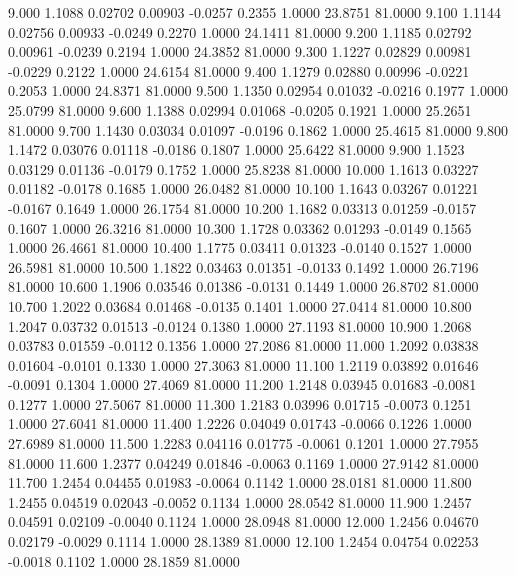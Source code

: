    9.000   1.1088   0.02702   0.00903  -0.0257   0.2355   1.0000  23.8751  81.0000
   9.100   1.1144   0.02756   0.00933  -0.0249   0.2270   1.0000  24.1411  81.0000
   9.200   1.1185   0.02792   0.00961  -0.0239   0.2194   1.0000  24.3852  81.0000
   9.300   1.1227   0.02829   0.00981  -0.0229   0.2122   1.0000  24.6154  81.0000
   9.400   1.1279   0.02880   0.00996  -0.0221   0.2053   1.0000  24.8371  81.0000
   9.500   1.1350   0.02954   0.01032  -0.0216   0.1977   1.0000  25.0799  81.0000
   9.600   1.1388   0.02994   0.01068  -0.0205   0.1921   1.0000  25.2651  81.0000
   9.700   1.1430   0.03034   0.01097  -0.0196   0.1862   1.0000  25.4615  81.0000
   9.800   1.1472   0.03076   0.01118  -0.0186   0.1807   1.0000  25.6422  81.0000
   9.900   1.1523   0.03129   0.01136  -0.0179   0.1752   1.0000  25.8238  81.0000
  10.000   1.1613   0.03227   0.01182  -0.0178   0.1685   1.0000  26.0482  81.0000
  10.100   1.1643   0.03267   0.01221  -0.0167   0.1649   1.0000  26.1754  81.0000
  10.200   1.1682   0.03313   0.01259  -0.0157   0.1607   1.0000  26.3216  81.0000
  10.300   1.1728   0.03362   0.01293  -0.0149   0.1565   1.0000  26.4661  81.0000
  10.400   1.1775   0.03411   0.01323  -0.0140   0.1527   1.0000  26.5981  81.0000
  10.500   1.1822   0.03463   0.01351  -0.0133   0.1492   1.0000  26.7196  81.0000
  10.600   1.1906   0.03546   0.01386  -0.0131   0.1449   1.0000  26.8702  81.0000
  10.700   1.2022   0.03684   0.01468  -0.0135   0.1401   1.0000  27.0414  81.0000
  10.800   1.2047   0.03732   0.01513  -0.0124   0.1380   1.0000  27.1193  81.0000
  10.900   1.2068   0.03783   0.01559  -0.0112   0.1356   1.0000  27.2086  81.0000
  11.000   1.2092   0.03838   0.01604  -0.0101   0.1330   1.0000  27.3063  81.0000
  11.100   1.2119   0.03892   0.01646  -0.0091   0.1304   1.0000  27.4069  81.0000
  11.200   1.2148   0.03945   0.01683  -0.0081   0.1277   1.0000  27.5067  81.0000
  11.300   1.2183   0.03996   0.01715  -0.0073   0.1251   1.0000  27.6041  81.0000
  11.400   1.2226   0.04049   0.01743  -0.0066   0.1226   1.0000  27.6989  81.0000
  11.500   1.2283   0.04116   0.01775  -0.0061   0.1201   1.0000  27.7955  81.0000
  11.600   1.2377   0.04249   0.01846  -0.0063   0.1169   1.0000  27.9142  81.0000
  11.700   1.2454   0.04455   0.01983  -0.0064   0.1142   1.0000  28.0181  81.0000
  11.800   1.2455   0.04519   0.02043  -0.0052   0.1134   1.0000  28.0542  81.0000
  11.900   1.2457   0.04591   0.02109  -0.0040   0.1124   1.0000  28.0948  81.0000
  12.000   1.2456   0.04670   0.02179  -0.0029   0.1114   1.0000  28.1389  81.0000
  12.100   1.2454   0.04754   0.02253  -0.0018   0.1102   1.0000  28.1859  81.0000
